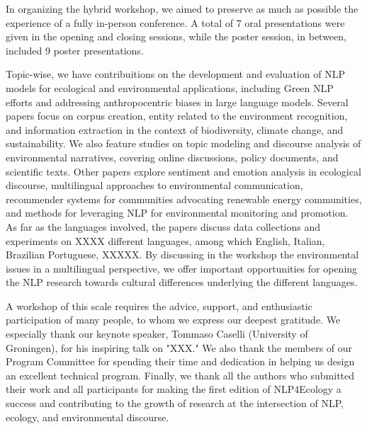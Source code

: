 In organizing the hybrid workshop, we aimed to preserve as much as possible the experience of a fully in-person conference. A total of 7 oral presentations were given in the opening and closing sessions, while the poster session, in between, included 9 poster presentations.

Topic-wise, we have contribuitions on the development and evaluation of NLP models for ecological and environmental applications, including Green NLP efforts and addressing anthropocentric biases in large language models. Several papers focus on corpus creation, entity related to the environment recognition, and information extraction in the context of biodiversity, climate change, and sustainability. We also feature studies on topic modeling and discourse analysis of environmental narratives, covering online discussions, policy documents, and scientific texts. Other papers explore sentiment and emotion analysis in ecological discourse, multilingual approaches to environmental communication, recommender systems for communities advocating renewable energy communities, and methods for leveraging NLP for environmental monitoring and promotion. As far as the languages involved, the papers discuss data collections and experiments on XXXX different languages, among which English, Italian, Brazilian Portuguese, XXXXX. By discussing in the workshop the environmental issues in a multilingual perspective, we offer important opportunities for opening the NLP research towards cultural differences underlying the different languages.

A workshop of this scale requires the advice, support, and enthusiastic participation of many people, to whom we express our deepest gratitude. We especially thank our keynote speaker, Tommaso Caselli (University of Groningen), for his inspiring talk on "XXX." We also thank the members of our Program Committee for spending their time and dedication in helping us design an excellent technical program. Finally, we thank all the authors who submitted their work and all participants for making the first edition of NLP4Ecology a success and contributing to the growth of research at the intersection of NLP, ecology, and environmental discourse.
